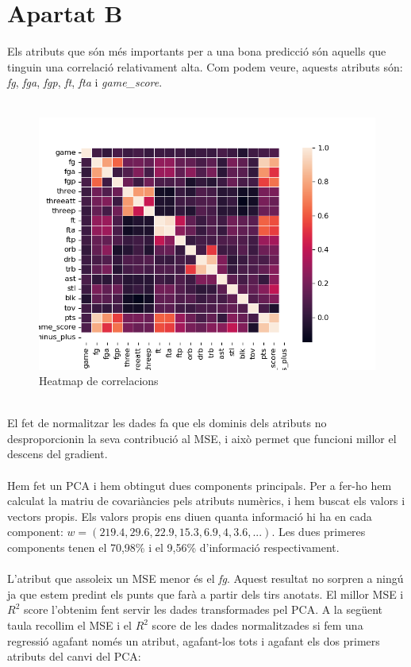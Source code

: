 \documentclass{article}
\begin{document}
\section*{Apartat B}
Els atributs que són més importants per a una bona predicció són aquells que tinguin una correlació relativament alta. Com podem veure, aquests atributs són: \textit{fg}, \textit{fga}, \textit{fgp}, \textit{ft}, \textit{fta} i \textit{game\_score}.\\ \\
\begin{figure}[h!]
	\centering
	\includegraphics[width=0.65\linewidth]{correlation}
	\caption{Heatmap de correlacions}
	\label{fig:correlation}
\end{figure}\\
\noindent
El fet de normalitzar les dades fa que els dominis dels atributs no desproporcionin la seva contribució al MSE, i això permet que funcioni millor el descens del gradient.\\
\\
\noindent
Hem fet un PCA i hem obtingut dues components principals. Per a fer-ho hem calculat la matriu de covariàncies pels atributs numèrics, i hem buscat els valors i vectors propis. Els valors propis ens diuen quanta informació hi ha en cada component: $w=(219.4, 29.6, 22.9, 15.3, 6.9, 4, 3.6, ...)$. Les dues primeres components tenen el 70,98\% i el 9,56\% d'informació respectivament.\\
\\
\noindent
L'atribut que assoleix un MSE menor és el \textit{fg}. Aquest resultat no sorpren a ningú ja que estem predint els punts que farà a partir dels tirs anotats. El millor MSE i $R^2$ score l'obtenim fent servir les dades transformades pel PCA. A la següent taula recollim el MSE i el $R^2$ score de les dades normalitzades si fem una regressió agafant només un atribut, agafant-los tots i agafant els dos primers atributs del canvi del PCA:\\
\end{document}
